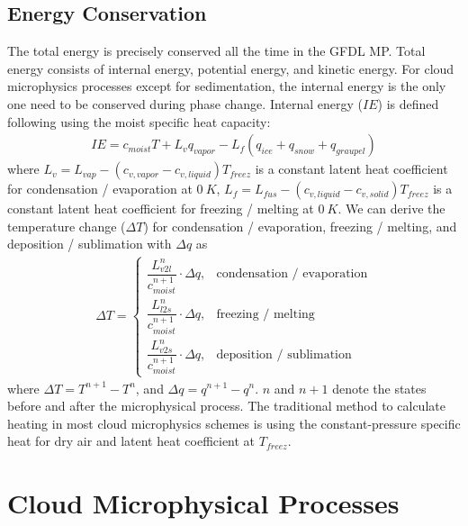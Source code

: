 \documentclass[letterpaper,titlepage,10pt]{article}
\numberwithin{equation}{section}
\begin{document}

\subsection{Energy Conservation}

The total energy is precisely conserved all the time in the GFDL MP. Total energy consists of internal energy, potential energy, and kinetic energy. For cloud microphysics processes except for sedimentation, the internal energy is the only one need to be conserved during phase change. Internal energy ($IE$) is defined following \citet{emanuel1994atmo} using the moist specific heat capacity:
\begin{gather}
	IE = c_{moist} T + L_v q_{vapor} - L_f \left(q_{ice} + q_{snow} + q_{graupel} \right)
\end{gather}
where $L_v = L_{vap} - \left(c_{v,vapor} - c_{v,liquid} \right) T_{freez}$ is a constant latent heat coefficient for condensation / evaporation at $0\ K$, $L_f = L_{fus} - \left(c_{v,liquid} - c_{v,solid} \right) T_{freez}$ is a constant latent heat coefficient for freezing / melting at $0\ K$. We can derive the temperature change ($\Delta T$) for condensation / evaporation, freezing / melting, and deposition / sublimation with $\Delta q$ as
\begin{align}
	\Delta T =
	\begin{cases}
	\dfrac{L^n_{v2l}}{c^{n+1}_{moist}} \cdot \Delta q, & \text{condensation / evaporation} \\[1em]
	\dfrac{L^n_{l2s}}{c^{n+1}_{moist}} \cdot \Delta q, & \text{freezing / melting} \\[1em] 
	\dfrac{L^n_{v2s}}{c^{n+1}_{moist}} \cdot \Delta q, & \text{deposition / sublimation}
	\end{cases}
\end{align}
where $\Delta T = T^{n+1} - T^n$, and $\Delta q = q^{n+1} - q^n$. $n$ and $n+1$ denote the states before and after the microphysical process. The traditional method to calculate heating in most cloud microphysics schemes is using the constant-pressure specific heat for dry air and latent heat coefficient at $T_{freez}$.


\newpage
\section{Cloud Microphysical Processes}
\end{document}
